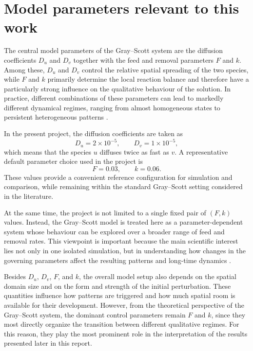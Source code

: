 \section{Model parameters relevant to this work}

The central model parameters of the Gray--Scott system are the diffusion coefficients $D_u$ and $D_v$ together with the feed and removal parameters $F$ and $k$. Among these, $D_u$ and $D_v$ control the relative spatial spreading of the two species, while $F$ and $k$ primarily determine the local reaction balance and therefore have a particularly strong influence on the qualitative behaviour of the solution. In practice, different combinations of these parameters can lead to markedly different dynamical regimes, ranging from almost homogeneous states to persistent heterogeneous patterns \citep{gandy2022,pearson1993}.

In the present project, the diffusion coefficients are taken as
\[
D_u = 2 \times 10^{-5}, \qquad D_v = 1 \times 10^{-5},
\]
which means that the species $u$ diffuses twice as fast as $v$. A representative default parameter choice used in the project is
\[
F = 0.03, \qquad k = 0.06.
\]
These values provide a convenient reference configuration for simulation and comparison, while remaining within the standard Gray--Scott setting considered in the literature.

At the same time, the project is not limited to a single fixed pair of $(F,k)$ values. Instead, the Gray--Scott model is treated here as a parameter-dependent system whose behaviour can be explored over a broader range of feed and removal rates. This viewpoint is important because the main scientific interest lies not only in one isolated simulation, but in understanding how changes in the governing parameters affect the resulting patterns and long-time dynamics \citep{gandy2022,pearson1993}.

Besides $D_u$, $D_v$, $F$, and $k$, the overall model setup also depends on the spatial domain size and on the form and strength of the initial perturbation. These quantities influence how patterns are triggered and how much spatial room is available for their development. However, from the theoretical perspective of the Gray--Scott system, the dominant control parameters remain $F$ and $k$, since they most directly organize the transition between different qualitative regimes. For this reason, they play the most prominent role in the interpretation of the results presented later in this report.